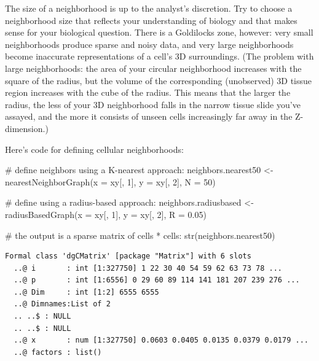 \documentclass[
  letterpaper,
  DIV=11,
  numbers=noendperiod]{scrartcl}
\newenvironment{Shaded}{\begin{snugshade}}{\end{snugshade}}
\newcommand{\AttributeTok}[1]{\textcolor[rgb]{0.40,0.45,0.13}{#1}}
\newcommand{\CommentTok}[1]{\textcolor[rgb]{0.37,0.37,0.37}{#1}}
\newcommand{\DecValTok}[1]{\textcolor[rgb]{0.68,0.00,0.00}{#1}}
\newcommand{\FloatTok}[1]{\textcolor[rgb]{0.68,0.00,0.00}{#1}}
\newcommand{\FunctionTok}[1]{\textcolor[rgb]{0.28,0.35,0.67}{#1}}
\newcommand{\NormalTok}[1]{\textcolor[rgb]{0.00,0.23,0.31}{#1}}
\newcommand{\OtherTok}[1]{\textcolor[rgb]{0.00,0.23,0.31}{#1}}
\begin{document}
The size of a neighborhood is up to the analyst's discretion. Try to
choose a neighborhood size that reflects your understanding of biology
and that makes sense for your biological question. There is a Goldilocks
zone, however: very small neighborhoods produce sparse and noisy data,
and very large neighborhoods become inaccurate representations of a
cell's 3D surroundings. (The problem with large neighborhoods: the area
of your circular neighborhood increases with the square of the radius,
but the volume of the corresponding (unobserved) 3D tissue region
increases with the cube of the radius. This means that the larger the
radius, the less of your 3D neighborhood falls in the narrow tissue
slide you've assayed, and the more it consists of unseen cells
increasingly far away in the Z-dimension.)

Here's code for defining cellular neighborhoods:

\begin{Shaded}
\begin{Highlighting}[]
\CommentTok{\# define neighbors using a K{-}nearest approach:}
\NormalTok{neighbors.nearest50 }\OtherTok{\textless{}{-}} \FunctionTok{nearestNeighborGraph}\NormalTok{(}\AttributeTok{x =}\NormalTok{ xy[, }\DecValTok{1}\NormalTok{], }\AttributeTok{y =}\NormalTok{ xy[, }\DecValTok{2}\NormalTok{], }\AttributeTok{N =} \DecValTok{50}\NormalTok{)}

\CommentTok{\# define using a radius{-}based approach:}
\NormalTok{neighbors.radiusbased }\OtherTok{\textless{}{-}} \FunctionTok{radiusBasedGraph}\NormalTok{(}\AttributeTok{x =}\NormalTok{ xy[, }\DecValTok{1}\NormalTok{], }\AttributeTok{y =}\NormalTok{ xy[, }\DecValTok{2}\NormalTok{], }\AttributeTok{R =} \FloatTok{0.05}\NormalTok{)}

\CommentTok{\# the output is a sparse matrix of cells * cells:}
\FunctionTok{str}\NormalTok{(neighbors.nearest50)}
\end{Highlighting}
\end{Shaded}

\begin{verbatim}
Formal class 'dgCMatrix' [package "Matrix"] with 6 slots
  ..@ i       : int [1:327750] 1 22 30 40 54 59 62 63 73 78 ...
  ..@ p       : int [1:6556] 0 29 60 89 114 141 181 207 239 276 ...
  ..@ Dim     : int [1:2] 6555 6555
  ..@ Dimnames:List of 2
  .. ..$ : NULL
  .. ..$ : NULL
  ..@ x       : num [1:327750] 0.0603 0.0405 0.0135 0.0379 0.0179 ...
  ..@ factors : list()
\end{verbatim}
\end{document}
